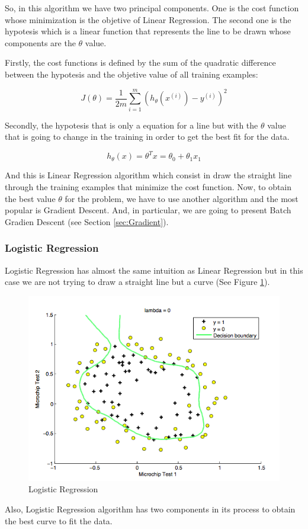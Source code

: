 \documentclass[12pt]{article}
\begin{document}
So, in this algorithm we have two principal components. One is the cost function whose minimization is the objetive of Linear Regression. The second one is the hypotesis which is a linear function that represents the line to be drawn whose components are the $\theta$ value. 

Firstly, the cost functions is defined by the sum of the quadratic difference between the hypotesis and the objetive value of all training examples:

\begin{equation}
  J(\theta)=\frac{1}{2m} \displaystyle\sum_{i=1}^{m} (h_{\theta}(x^{(i)})-y^{(i)})^2
\end{equation}

Secondly, the hypotesis that is only a equation for a line but with the $\theta$ value that is going to change in the training in order to get the best fit for the data.

\begin{equation}
  h_{\theta}(x)=\theta^Tx=\theta_{0}+\theta_{1}x_{1}
\end{equation}

And this is Linear Regression algorithm which consist in draw the straight line through the training examples that minimize the cost function. Now, to obtain the best value $\theta$ for the problem, we have to use another algorithm and the most popular is Gradient Descent. And, in particular, we are going to present Batch Gradien Descent (see Section \ref{sec:Gradient}).

\subsubsection{Logistic Regression}
Logistic Regression has almost the same intuition as Linear Regression but in this case we are not trying to draw a straight line but a curve (See Figure \ref{fig:figure4}).
\begin{figure}[ht]
\centering
\includegraphics[width=.4\textwidth]{Logistic.png}
\caption{Logistic Regression}
\label{fig:figure4}
\end{figure}
Also, Logistic Regression algorithm has two components in its process to obtain the best curve to fit the data.
\end{document}
